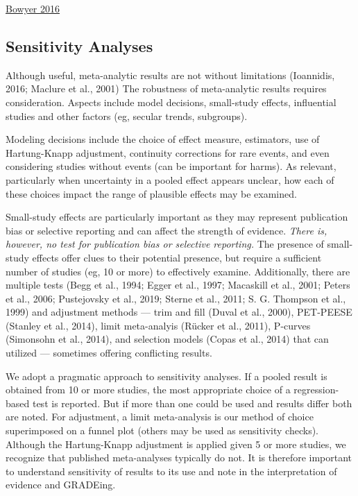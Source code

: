 \documentclass[
  letterpaper,
  DIV=11,
  numbers=noendperiod]{scrreprt}
\begin{document}
\href{https://associationofanaesthetists-publications.onlinelibrary.wiley.com/doi/epdf/10.1111/anae.13312}{Bowyer
2016}

\hypertarget{sensitivity-analyses}{%
\subsection{Sensitivity Analyses}\label{sensitivity-analyses}}

Although useful, meta-analytic results are not without limitations
(Ioannidis, 2016; Maclure et al., 2001) The robustness of meta-analytic
results requires consideration. Aspects include model decisions,
small-study effects, influential studies and other factors (eg, secular
trends, subgroups).

Modeling decisions include the choice of effect measure, estimators, use
of Hartung-Knapp adjustment, continuity corrections for rare events, and
even considering studies without events (can be important for harms). As
relevant, particularly when uncertainty in a pooled effect appears
unclear, how each of these choices impact the range of plausible effects
may be examined.

Small-study effects are particularly important as they may represent
publication bias or selective reporting and can affect the strength of
evidence. \emph{There is, however, no test for publication bias or
selective reporting.} The presence of small-study effects offer clues to
their potential presence, but require a sufficient number of studies
(eg, 10 or more) to effectively examine. Additionally, there are
multiple tests (Begg et al., 1994; Egger et al., 1997; Macaskill et al.,
2001; Peters et al., 2006; Pustejovsky et al., 2019; Sterne et al.,
2011; S. G. Thompson et al., 1999) and adjustment methods --- trim and
fill (Duval et al., 2000), PET-PEESE (Stanley et al., 2014), limit
meta-analyis (Rücker et al., 2011), P-curves (Simonsohn et al., 2014),
and selection models (Copas et al., 2014) that can utilized ---
sometimes offering conflicting results.

We adopt a pragmatic approach to sensitivity analyses. If a pooled
result is obtained from 10 or more studies, the most appropriate choice
of a regression-based test is reported. But if more than one could be
used and results differ both are noted. For adjustment, a limit
meta-analysis is our method of choice superimposed on a funnel plot
(others may be used as sensitivity checks). Although the Hartung-Knapp
adjustment is applied given 5 or more studies, we recognize that
published meta-analyses typically do not. It is therefore important to
understand sensitivity of results to its use and note in the
interpretation of evidence and GRADEing.
\end{document}
